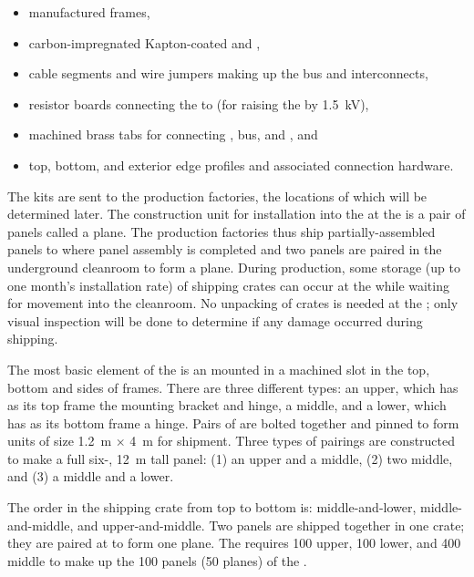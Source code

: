 \begin{itemize}
\item manufactured \frfour {} frames, %
\item carbon-impregnated Kapton-coated  and ,
\item {} cable segments and wire jumpers making up the   bus and  interconnects,
\item resistor boards connecting the  to  (for raising the   by \SI{1.5}{\kV}),
\item machined brass tabs for connecting ,  bus, and , and
\item top, bottom, and exterior edge profiles and associated connection hardware.
\end{itemize}
The kits are sent to the production factories, the locations of which will be determined later.  
The %
 construction unit for installation into the  at the  is a pair of  panels called a  plane. The production factories thus ship partially-assembled  panels to  where panel assembly is completed and two panels are paired in the underground cleanroom to form a  plane. During production, some storage (up to one month's installation rate) of  shipping crates can occur at the  while waiting for movement into the  cleanroom.  No unpacking of crates is needed at the ; only visual inspection will be done to determine if any damage occurred during shipping.

The most basic element of the  
is an  mounted in a machined slot in the top, bottom and sides of \frfour frames.  
There are three different  types: an upper, which has as its top frame the  mounting bracket and  hinge, a middle, and a lower, which has as its bottom frame a  hinge.  
Pairs of  are bolted together and pinned to form  units of size \SI{1.2}{\m} $\times$ \SI{4}{\m} for shipment. Three types of pairings are constructed to make a full six-, \SI{12}{\m} tall  panel: (1) an upper and a middle, (2) two middle, and (3) a middle and a lower.

The order in the shipping crate from top to bottom is: middle-and-lower, middle-and-middle, and upper-and-middle.   Two  panels are shipped together in one crate; they are paired at  to form one  plane.  The  requires 100 upper, 100 lower, and 400 middle  to make up the 100  panels (50  planes) of the .


